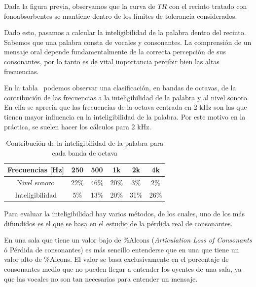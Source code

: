 \par Dada la figura previa, observamos que la curva de $TR$ con el recinto tratado con fonoabsorbentes se mantiene dentro de los límites de tolerancia considerados.

\par Dado esto, pasamos a calcular la inteligibilidad de la palabra dentro del recinto. Sabemos que una palabra consta de vocales y consonantes. La comprensión de un mensaje oral depende fundamentalmente de la correcta percepción de sus consonantes, por lo tanto es de vital importancia percibir bien las altas frecuencias.

\par En la tabla~ podemos observar una clasificación, en bandas de octavas, de la contribución de las frecuencias a la inteligibilidad de la palabra y al nivel sonoro. En ella se aprecia que las frecuencias de la octava centrada en 2 kHz son las que tienen mayor influencia en la inteligibilidad de la palabra. Por este motivo en la práctica, se suelen hacer los cálculos para 2 kHz.

\begin{table}[h]
    \centering
    \begin{tabular}{|c|c|c|c|c|c|} \hline
        Frecuencias [Hz] & 250 & 500 & 1k & 2k & 4k  \\ \hline
        Nivel sonoro &22\%& 46\% & 20\% &3\% &2\% \\ \hline
        Inteligibilidad &5\% &13\% &20\% &31\% &26\% \\ \hline
    \end{tabular}
    \caption{Contribución de la inteligibilidad de la palabra para cada banda de octava}
    \label{tab:Contribucion_inteligibilidad_x_banda_de_octava}
\end{table}

\par Para evaluar la inteligibilidad hay varios métodos, de los cuales, uno de los más difundidos es el que se basa en el estudio de la pérdida real de consonantes.

\par En una sala que tiene un valor bajo de \%Alcons (\textit{Articulation Loss of Consonants} ó Pérdida de consonantes) es más sencillo entenderse que en una que tiene un valor alto de \%Alcons. El valor se basa exclusivamente en el porcentaje de consonantes medio que no pueden llegar a entender los oyentes de una sala, ya que las vocales no son tan necesarias para entender un mensaje.

